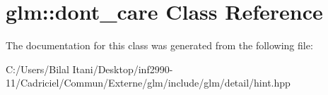 \hypertarget{classglm_1_1dont__care}{}\section{glm\+:\+:dont\+\_\+care Class Reference}
\label{classglm_1_1dont__care}


The documentation for this class was generated from the following file\+:\begin{DoxyCompactItemize}
\item 
C\+:/\+Users/\+Bilal Itani/\+Desktop/inf2990-\/11/\+Cadriciel/\+Commun/\+Externe/glm/include/glm/detail/hint.\+hpp\end{DoxyCompactItemize}
